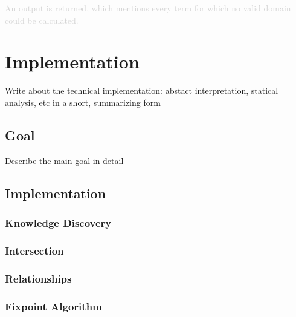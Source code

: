 \documentclass[a4paper]{article}
\begin{document}
\textcolor{lightgray}{An output is returned, which mentions every term for which
no valid domain could be calculated. }

\section{Implementation}
Write about the technical implementation: abstact interpretation, statical
analysis, etc in a short, summarizing form
\subsection{Goal}
Describe the main goal in detail
\subsection{Implementation}
\subsubsection{Knowledge Discovery}
\subsubsection{Intersection}
\subsubsection{Relationships}
\subsubsection{Fixpoint Algorithm}
\end{document}
